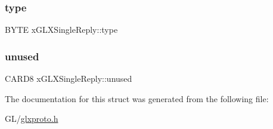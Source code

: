 \subsubsection{\texorpdfstring{type}{type}}
{\footnotesize\ttfamily B\+Y\+TE x\+G\+L\+X\+Single\+Reply\+::type}

\mbox{\label{structx_g_l_x_single_reply_a84b2a531e635ac81d9625cd448cb6ed4}} 
\subsubsection{\texorpdfstring{unused}{unused}}
{\footnotesize\ttfamily C\+A\+R\+D8 x\+G\+L\+X\+Single\+Reply\+::unused}



The documentation for this struct was generated from the following file\+:\begin{DoxyCompactItemize}
\item 
G\+L/\hyperlink{glxproto_8h}{glxproto.\+h}\end{DoxyCompactItemize}
